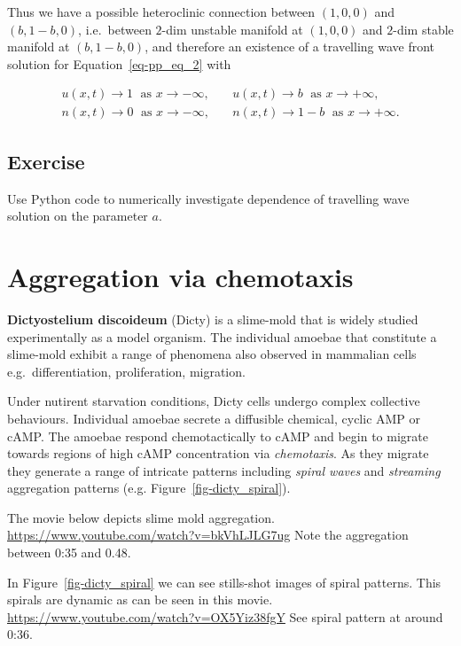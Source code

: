 \documentclass[
  letterpaper,
  DIV=11,
  numbers=noendperiod]{scrreprt}
\theoremstyle{plain}
\theoremstyle{definition}
\theoremstyle{plain}
\theoremstyle{remark}
\begin{document}
Thus we have a possible heteroclinic connection between \((1,0,0)\) and
\((b, 1-b, 0)\), i.e.~between \(2\)-dim unstable manifold at \((1,0,0)\)
and \(2\)-dim stable manifold at \((b, 1-b, 0)\), and therefore an
existence of a travelling wave front solution for
Equation~\ref{eq-pp_eq_2} with

\[
\begin{aligned}
u(x,t) \to 1 \; \textrm{ as } x \to - \infty,  \quad & u(x,t) \to b \; \textrm{ as } x \to +\infty,  \\
n(x,t) \to 0 \;  \textrm{ as } x \to - \infty ,  \quad & n(x,t) \to 1-b \; \textrm{ as } x \to +\infty.
\end{aligned}
\]

\hypertarget{exercise}{%
\section{Exercise}\label{exercise}}

Use Python code to numerically investigate dependence of travelling wave
solution on the parameter \(a\).

\hypertarget{aggregation-via-chemotaxis}{%
\chapter{Aggregation via chemotaxis}\label{aggregation-via-chemotaxis}}

\textbf{Dictyostelium discoideum} (Dicty) is a slime-mold that is widely
studied experimentally as a model organism. The individual amoebae that
constitute a slime-mold exhibit a range of phenomena also observed in
mammalian cells e.g.~differentiation, proliferation, migration.

Under nutirent starvation conditions, Dicty cells undergo complex
collective behaviours. Individual amoebae secrete a diffusible chemical,
cyclic AMP or cAMP. The amoebae respond chemotactically to cAMP and
begin to migrate towards regions of high cAMP concentration via
\emph{chemotaxis}. As they migrate they generate a range of intricate
patterns including \emph{spiral waves} and \emph{streaming} aggregation
patterns (e.g. Figure~\ref{fig-dicty_spiral}).

The movie below depicts slime mold aggregation.
\url{https://www.youtube.com/watch?v=bkVhLJLG7ug} Note the aggregation
between 0:35 and 0.48.

In Figure~\ref{fig-dicty_spiral} we can see stills-shot images of spiral
patterns. This spirals are dynamic as can be seen in this movie.
\url{https://www.youtube.com/watch?v=OX5Yiz38fgY} See spiral pattern at
around 0:36.
\end{document}
